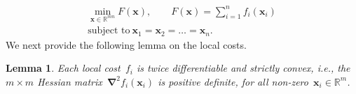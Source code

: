 \documentclass[letterpaper, 10pt, conference]{ieeeconf}
\newtheorem{lem}{Lemma}
\newtheorem{ass}{Assumption}
\def\mb{\mathbf}
\def\mc{\mathcal}
\begin{document}
\begin{align}\nonumber
\min_{\mb{x} \in \mathbb{R}^{mn}}
F(\mb{x}),\qquad F(\mb x) = \sum_{i=1}^{n} f_i(\mb{x}_i)\\\label{eq_prob} \text{subject to} ~ \mb{x}_1 = \mb{x}_2 = \dots = \mb{x}_n.
\end{align}
We next provide the following lemma on the local costs. 
\begin{lem} \label{lem_f(x)}
\cite{garg2019fixed2} Each local cost~$f_i$ is twice differentiable and strictly convex, i.e., the~$m\times m$ Hessian matrix~$\boldsymbol{ \nabla}^2 f_i(\mb{x}_i)$ is positive definite, for all non-zero~$\mb x_i\in\mathbb R^m$.
\end{lem} 

\end{document}
